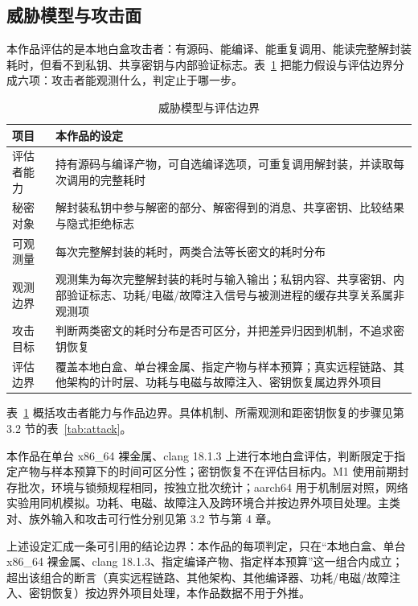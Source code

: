 \subsection{威胁模型与攻击面}

本作品评估的是本地白盒攻击者：有源码、能编译、能重复调用、能读完整解封装耗时，但看不到私钥、共享密钥与内部验证标志。表~\ref{tab:threat} 把能力假设与评估边界分成六项：攻击者能观测什么，判定止于哪一步。

\begin{table}[H]
\centering
\caption{威胁模型与评估边界}
\label{tab:threat}
{\small
\begin{tabularx}{\textwidth}{|>{\raggedright\arraybackslash}p{3.0cm}|>{\raggedright\arraybackslash}X|}
\hline
项目 & 本作品的设定 \\
\hline
评估者能力 & 持有源码与编译产物，可自选编译选项，可重复调用解封装，并读取每次调用的完整耗时 \\
\hline
秘密对象 & 解封装私钥中参与解密的部分、解密得到的消息、共享密钥、比较结果与隐式拒绝标志 \\
\hline
可观测量 & 每次完整解封装的耗时，两类合法等长密文的耗时分布 \\
\hline
观测边界 & 观测集为每次完整解封装的耗时与输入输出；私钥内容、共享密钥、内部验证标志、功耗/电磁/故障注入信号与被测进程的缓存共享关系属非观测项 \\
\hline
攻击目标 & 判断两类密文的耗时分布是否可区分，并把差异归因到机制，不追求密钥恢复 \\
\hline
评估边界 & 覆盖本地白盒、单台裸金属、指定产物与样本预算；真实远程链路、其他架构的计时层、功耗与电磁与故障注入、密钥恢复属边界外项目 \\
\hline
\end{tabularx}
}
\end{table}

表~\ref{tab:threat} 概括攻击者能力与作品边界。具体机制、所需观测和距密钥恢复的步骤见第 3.2 节的表~\ref{tab:attack}。

本作品在单台 x86\_64 裸金属、clang 18.1.3 上进行本地白盒评估，判断限定于指定产物与样本预算下的时间可区分性；密钥恢复不在评估目标内。M1 使用前期封存批次，环境与锁频规程相同，按独立批次统计；aarch64 用于机制层对照，网络实验用同机模拟。功耗、电磁、故障注入及跨环境合并按边界外项目处理。主类对、族外输入和攻击可行性分别见第 3.2 节与第 4 章。

上述设定汇成一条可引用的结论边界：本作品的每项判定，只在“本地白盒、单台 x86\_64 裸金属、clang 18.1.3、指定编译产物、指定样本预算”这一组合内成立；超出该组合的断言（真实远程链路、其他架构、其他编译器、功耗/电磁/故障注入、密钥恢复）按边界外项目处理，本作品数据不用于外推。

